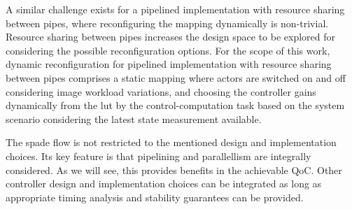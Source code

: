 A similar challenge exists for a pipelined implementation with resource sharing between pipes, where reconfiguring the mapping dynamically is non-trivial. 
Resource sharing between pipes increases the design space to be explored for considering the possible reconfiguration options. 
For the scope of this work, dynamic reconfiguration for pipelined implementation with resource sharing between pipes comprises a static mapping where actors are switched on and off considering image workload variations, and choosing the controller gains dynamically from the \gls{lut} by the control-computation task based on the system scenario considering the latest state measurement available.

The \gls{spade} flow is not restricted to the mentioned design and implementation choices. Its key feature is that pipelining and parallellism are integrally considered. As we will see, this provides benefits in the achievable QoC. Other controller design and implementation choices can be integrated as long as appropriate timing analysis and stability guarantees can be provided.